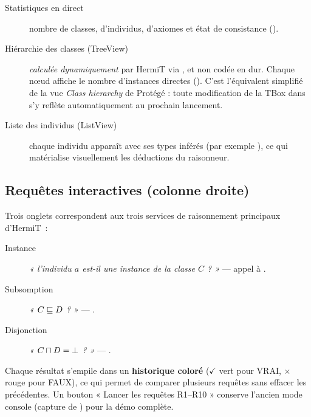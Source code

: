 \begin{description}
  \item[Statistiques en direct] nombre de classes, d'individus, d'axiomes et
        état de consistance ().

  \item[Hiérarchie des classes (TreeView)] \emph{calculée dynamiquement} par
        HermiT via , et non codée en dur. Chaque
        nœud affiche le nombre d'instances directes
        (). C'est l'équivalent simplifié de la
        vue \emph{Class hierarchy} de Protégé : toute modification de la TBox
        dans  s'y reflète automatiquement au
        prochain lancement.

  \item[Liste des individus (ListView)] chaque individu apparaît avec ses
        types inférés (par exemple 
        ), ce qui matérialise
        visuellement les déductions du raisonneur.
\end{description}

\subsection{Requêtes interactives (colonne droite)}

Trois onglets correspondent aux trois services de raisonnement principaux
d'HermiT~:

\begin{description}
  \item[Instance] \emph{« l'individu $a$ est-il une instance de la classe $C$ ? »}
        — appel à .
  \item[Subsomption] \emph{« $C \sqsubseteq D$ ? »} —
        .
  \item[Disjonction] \emph{« $C \sqcap D = \bot$ ? »} —
        .
\end{description}

\noindent Chaque résultat s'empile dans un \textbf{historique coloré}
($\checkmark$ vert pour VRAI, $\times$ rouge pour FAUX), ce qui permet de
comparer plusieurs requêtes sans effacer les précédentes.
Un bouton « Lancer les requêtes R1–R10 » conserve l'ancien mode console
(capture de ) pour la démo complète.

